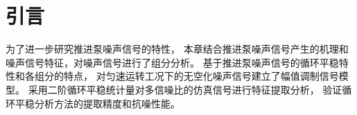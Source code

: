 \section{引言}
为了进一步研究推进泵噪声信号的特性，
本章结合推进泵噪声信号产生的机理和噪声信号特征，对噪声信号进行了组分分析。
基于推进泵噪声信号的循环平稳特性和各组分的特点，
对匀速运转工况下的无空化噪声信号建立了幅值调制信号模型。
采用二阶循环平稳统计量对多信噪比的仿真信号进行特征提取分析，
验证循环平稳分析方法的提取精度和抗噪性能。
\begin{comment}
推进泵噪声按声源类型的不同，可以将推进泵噪声分为流致噪声和振动噪声，其中流致噪声是推进泵噪声的主要贡献者。
流致噪声是由泵内非定常流动与泵相互作用产生的非定常流致激励所引起的，
前期研究发现，推进泵叶轮与其他部件之间的动静干涉是重要的流致噪声激励源。
动静干涉是指由于推进泵转子（如叶轮）和静止部件（如导叶和导管）之间的周
向不均匀流动在旋转过程中相互作用，从而导致了泵内部流道中复杂的非定常流动现象。
因此，推进泵噪声是推进泵流致激励特性的最直接的外在表现，
构建推进泵流致激励源特征提取的有效方法和途径，从噪声信号中分析出流致激励源
的影响程度以及两者的作用机理，对于推进泵低噪声设计及发展噪声能量主动控制技术至关重要。

第三章推进泵噪声试验结果显示，监测到的推进泵噪声频谱特性表现为中低频线谱噪声，中低频宽带谱噪声和
高频宽带谱噪声。
噪声信号中蕴含着丰富的流致激励源信息，但是难以从噪声信号频谱中提取出流致激励源特征信号，信号中存在复杂的干扰因素：
其一，推进泵处在复杂的背景环境声场中，背景声场中存在复杂的干扰
成分，影响测试系统对推进泵目标真实辐射噪声信号的监测；其二，推进泵结构复杂，
由于具有周期性分布的旋转、静止构件和导管，
辐射噪声的声源构件并不单一，其辐射噪声具有分量复杂性。
基于上述干扰因素，监测系统接收到的目标声场信号的
信噪比较低，特征信号如动静干涉频率、轴频等与其他背景噪声相比均较为微弱，给基于传统噪声特征提取方法带来了困难，
难以准确的获得推进泵的工作状态和结构信息，也给流致激励源特征的提取带来很大的难度。

其次，推进泵流致噪声存在显著的调制现象，上章节所研究的推进泵噪声频谱已呈现出较强的调制特性，
调制现象也是流致激励作用的结果，其中蕴含着丰富的流致激励源信息，
但是传统的频谱分析及解调方法无法实现高精度低频调制特征的提取。
因此，针对推进泵噪声信号的特点，开展对其噪声信号的分量分析研究，
基于其信号的循环平稳特性，
建立流致激励源-噪声信号模型，
探索合适的流致激励源特征提取方法，对噪声的机理分析和流致激励源特征提取有重要意义。
\end{comment}

